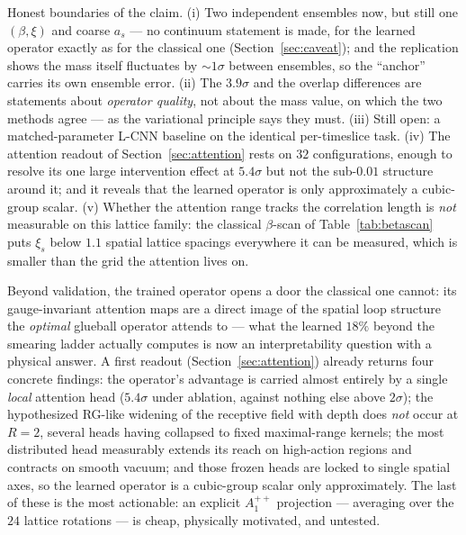 \documentclass[11pt,a4paper]{article}
\newcommand{\as}{a_s}
\begin{document}
Honest boundaries of the claim. (i) Two independent ensembles now, but still
one $(\beta,\xi)$ and coarse $\as$ --- no continuum statement is made, for
the learned operator exactly as for the classical one
(Section~\ref{sec:caveat}); and the replication shows the mass itself
fluctuates by $\sim1\sigma$ between ensembles, so the ``anchor'' carries its
own ensemble error. (ii) The $3.9\sigma$ and the overlap
differences are statements about \emph{operator quality}, not about the mass
value, on which the two methods agree --- as the variational principle says
they must.
(iii) Still open: a matched-parameter L-CNN baseline on the identical
per-timeslice task.
(iv) The attention readout of Section~\ref{sec:attention} rests on $32$
configurations, enough to resolve its one large intervention effect at
$5.4\sigma$ but not the sub-$0.01$ structure around it; and it reveals that
the learned operator is only approximately a cubic-group scalar.
(v) Whether the attention range tracks the correlation length is
\emph{not} measurable on this lattice family: the classical $\beta$-scan of
Table~\ref{tab:betascan} puts $\xi_s$ below $1.1$ spatial lattice spacings
everywhere it can be measured, which is smaller than the grid the attention
lives on.

Beyond validation, the trained operator opens a door the classical one
cannot: its gauge-invariant attention maps are a direct image of the spatial
loop structure the \emph{optimal} glueball operator attends to --- what the
learned $18\%$ beyond the smearing ladder actually computes is now an
interpretability question with a physical answer. A first readout
(Section~\ref{sec:attention}) already returns four concrete findings: the
operator's advantage is carried almost entirely by a single \emph{local}
attention head ($5.4\sigma$ under ablation, against nothing else above
$2\sigma$); the hypothesized RG-like widening of the receptive field with
depth does \emph{not} occur at $R=2$, several heads having collapsed to fixed
maximal-range kernels; the most distributed head measurably extends its reach
on high-action regions and contracts on smooth vacuum; and those frozen heads
are locked to single spatial axes, so the learned operator is a cubic-group
scalar only approximately. The last of these is the most actionable: an
explicit $A_1^{++}$ projection --- averaging over the $24$ lattice rotations
--- is cheap, physically motivated, and untested.
\end{document}
